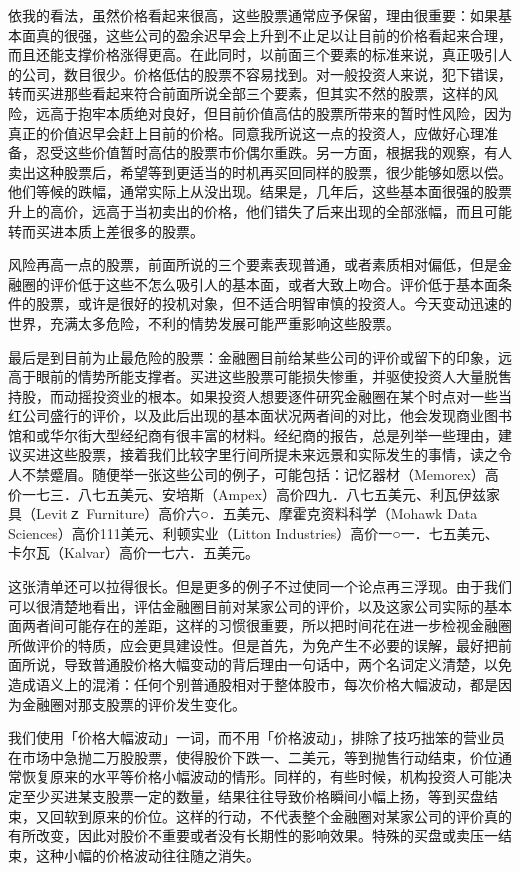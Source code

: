 \documentclass[UTF8,a4paper,zihao=-4,fontset = windows]{ctexart} %
\begin{document}
依我的看法，虽然价格看起来很高，这些股票通常应予保留，理由很重要：如果基本面真的很强，这些公司的盈余迟早会上升到不止足以让目前的价格看起来合理，而且还能支撑价格涨得更高。在此同时，以前面三个要素的标准来说，真正吸引人的公司，数目很少。价格低估的股票不容易找到。对一般投资人来说，犯下错误，转而买进那些看起来符合前面所说全部三个要素，但其实不然的股票，这样的风险，远高于抱牢本质绝对良好，但目前价值高估的股票所带来的暂时性风险，因为真正的价值迟早会赶上目前的价格。同意我所说这一点的投资人，应做好心理准备，忍受这些价值暂时高估的股票市价偶尔重跌。另一方面，根据我的观察，有人卖出这种股票后，希望等到更适当的时机再买回同样的股票，很少能够如愿以偿。他们等候的跌幅，通常实际上从没出现。结果是，几年后，这些基本面很强的股票升上的高价，远高于当初卖出的价格，他们错失了后来出现的全部涨幅，而且可能转而买进本质上差很多的股票。

风险再高一点的股票，前面所说的三个要素表现普通，或者素质相对偏低，但是金融圈的评价低于这些不怎么吸引人的基本面，或者大致上吻合。评价低于基本面条件的股票，或许是很好的投机对象，但不适合明智审慎的投资人。今天变动迅速的世界，充满太多危险，不利的情势发展可能严重影响这些股票。

最后是到目前为止最危险的股票：金融圈目前给某些公司的评价或留下的印象，远高于眼前的情势所能支撑者。买进这些股票可能损失惨重，并驱使投资人大量脱售持股，而动摇投资业的根本。如果投资人想要逐件研究金融圈在某个时点对一些当红公司盛行的评价，以及此后出现的基本面状况两者间的对比，他会发现商业图书馆和或华尔街大型经纪商有很丰富的材料。经纪商的报告，总是列举一些理由，建议买进这些股票，接着我们比较字里行间所提未来远景和实际发生的事情，读之令人不禁蹙眉。随便举一张这些公司的例子，可能包括：记忆器材（Memorex）高价一七三．八七五美元、安培斯（Ampex）高价四九．八七五美元、利瓦伊兹家具（Levitｚ Furniture）高价六○．五美元、摩霍克资料科学（Mohawk Data Sciences）高价111美元、利顿实业（Litton Industries）高价一○一．七五美元、卡尔瓦（Kalvar）高价一七六．五美元。

这张清单还可以拉得很长。但是更多的例子不过使同一个论点再三浮现。由于我们可以很清楚地看出，评估金融圈目前对某家公司的评价，以及这家公司实际的基本面两者间可能存在的差距，这样的习惯很重要，所以把时间花在进一步检视金融圈所做评价的特质，应会更具建设性。但是首先，为免产生不必要的误解，最好把前面所说，导致普通股价格大幅变动的背后理由一句话中，两个名词定义清楚，以免造成语义上的混淆：任何个别普通股相对于整体股市，每次价格大幅波动，都是因为金融圈对那支股票的评价发生变化。

我们使用「价格大幅波动」一词，而不用「价格波动」，排除了技巧拙笨的营业员在市场中急抛二万股股票，使得股价下跌一、二美元，等到抛售行动结束，价位通常恢复原来的水平等价格小幅波动的情形。同样的，有些时候，机构投资人可能决定至少买进某支股票一定的数量，结果往往导致价格瞬间小幅上扬，等到买盘结束，又回软到原来的价位。这样的行动，不代表整个金融圈对某家公司的评价真的有所改变，因此对股价不重要或者没有长期性的影响效果。特殊的买盘或卖压一结束，这种小幅的价格波动往往随之消失。
\end{document}
